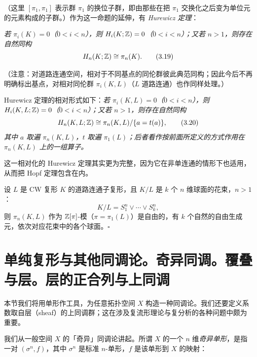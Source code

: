 （这里 $[\pi_1,\pi_1]$ 表示群 $\pi_1$ 的换位子群，即由那些在把 $\pi_1$ 交换化之后变为单位元的元素构成的子群。）作为这一命题的延伸，有 \emph{Hurewicz 定理}：

\emph{若 $\pi_i(K)=0$（$0<i<n$），则 $H_i(K;\mathbb{Z})=0$（$0<i<n$）；又若 $n>1$，则存在自然同构}
\begin{equation}
  H_n(K;\mathbb{Z})\cong\pi_n(K). \tag{3.19}
\end{equation}

（注意：对道路连通空间，相对于不同基点的同伦群彼此典范同构；因此今后不再明确标出基点，对相对同伦群 $\pi_i(K,L)$（$L$ 道路连通）也作同样处理。）

Hurewicz 定理的相对形式如下：\emph{若 $\pi_i(K,L)=0$（$0<i<n$），则 $H_i(K,L;\mathbb{Z})=0$（$0<i<n$）；又若 $n>1$，则存在自然同构}
\begin{equation}
  H_n(K,L;\mathbb{Z})\cong\pi_n(K,L)/\{a=t(a)\}, \tag{3.20}
\end{equation}
\emph{其中 $a$ 取遍 $\pi_n(K,L)$，$t$ 取遍 $\pi_1(L)$；后者看作按前面所定义的方式作用在 $\pi_n(K,L)$ 上的一组算子。}

这一相对化的 Hurewicz 定理其实更为完整，因为它在非单连通的情形下也适用，从而把 Hopf 定理包含在内。

\begin{example*}
设 $L$ 是 CW 复形 $K$ 的道路连通子复形，且 $K/L$ 是 $k$ 个 $n$ 维球面的花束，$n>1$：
\[
  K/L=S_1^n\vee\cdots\vee S_k^n,
\]
则 $\pi_n(K,L)$ 作为 $\mathbb{Z}[\pi]$-模（$\pi=\pi_1(L)$）是自由的，有 $k$ 个自然的自由生成元，依次对应花束中的各个球面。\hfill$\square$
\end{example*}

\section{单纯复形与其他同调论。奇异同调。覆叠与层。层的正合列与上同调}

本节我们将用单形作工具，为任意拓扑空间 $X$ 构造一种同调论。我们还要定义系数取自层（sheaf）的上同调群；这在涉及复流形理论与复分析的各种问题中颇为重要。

我们从一般空间 $X$ 的「奇异」同调论讲起。所谓 $X$ 的一个 $n$ 维\emph{奇异单形}，是指一对 $(\sigma^n,f)$，其中 $\sigma^n$ 是标准 $n$-单形，$f$ 是该单形到 $X$ 的映射：

